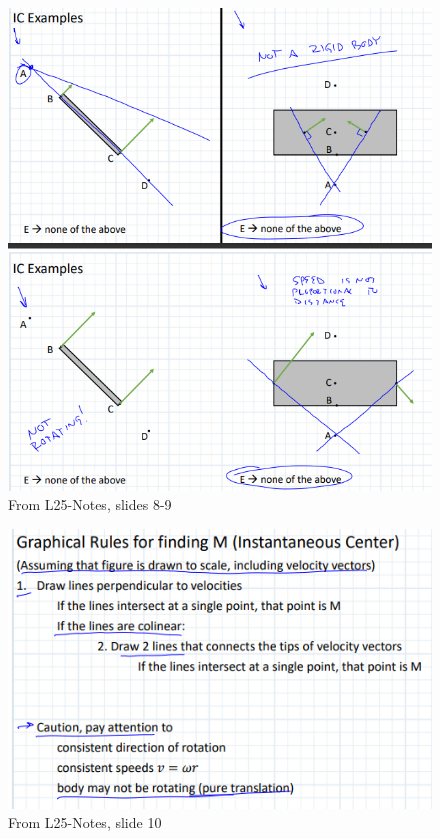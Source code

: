 \begin{figure}[h!]
    \centering \includegraphics{RigidBodyKineticsFigs/ICexamples2.png}
    \caption{From L25-Notes, slides 8-9}
    \label{fig:ICexamples2}
\end{figure}


\begin{figure}[h!]
    \centering \includegraphics{RigidBodyKineticsFigs/ICgraphicalRules.png}
    \caption{From L25-Notes, slide 10}
    \label{fig:ICgraphRules}
\end{figure}

